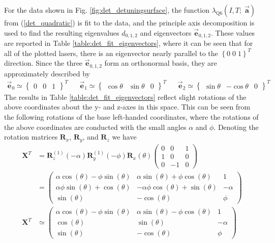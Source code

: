 \documentclass[12pt]{report}
\begin{document}
	For the data shown in Fig. \ref{fig:det_detuningsurface}, the function $\lambda_\mathrm{Q6}(I, T;\; \vec{\mathbf{a}})$ from (\ref{det_quadratic}) is fit to the data, and the principle axis decomposition is used to find the resulting eigenvalues $d_{0,1,2}$ and eigenvectors $\vec{\textbf{e}}_{0,1,2}$. These values are reported in Table \ref{table:det_fit_eigenvectors}, where it can be seen that for all of the plotted lasers, there is an eigenvector nearly parallel to the $\left\{0\;0\;1\right\}^T$ direction. Since the three $\vec{\textbf{e}}_{0,1,2}$ form an orthonormal basis, they are approximately described by
	\begin{align}
		\vec{\textbf{e}}_0 \simeq \begin{Bmatrix} 0 & 0 & 1 \end{Bmatrix}^T &&
		\vec{\textbf{e}}_1 \simeq \begin{Bmatrix} \cos\theta & \sin\theta & 0 \end{Bmatrix}^T &&
		\vec{\textbf{e}}_2 \simeq \begin{Bmatrix} \sin\theta & -\cos\theta & 0 \end{Bmatrix}^T &&
	\end{align}
	The results in Table \ref{table:det_fit_eigenvectors} reflect slight rotations of the above coordinates about the y- and z-axes in this space. This can be seen from the following rotations of the base left-handed coordinates, where the rotations of the above coordinates are conducted with the small angles $\alpha$ and $\phi$. Denoting the rotation matrices $\textbf{R}_x$, $\textbf{R}_y$, and $\textbf{R}_z$ we have
	\begin{align} \label{det_eigen_rotation}
		\textbf{X}^T &= \textbf{R}^{(1)}_z(-\alpha) \textbf{R}^{(1)}_y(-\phi) \textbf{R}_x(\theta)
		\begin{pmatrix}
			0 & 0 & 1 \\
			1 & 0 & 0 \\
			0 & -1 & 0
		\end{pmatrix} \nonumber\\
		&=\left(\begin{matrix}\alpha \cos{\left(\theta \right)} - \phi \sin{\left(\theta \right)} & \alpha \sin{\left(\theta \right)} + \phi \cos{\left(\theta \right)} & 1\\\alpha \phi \sin{\left(\theta \right)} + \cos{\left(\theta \right)} & - \alpha \phi \cos{\left(\theta \right)} + \sin{\left(\theta \right)} & - \alpha\\\sin{\left(\theta \right)} & - \cos{\left(\theta \right)} & \phi\end{matrix}\right) \nonumber\\
		\textbf{X}^T & \simeq
		\left(\begin{matrix}\alpha \cos{\left(\theta \right)} - \phi \sin{\left(\theta \right)} & \alpha \sin{\left(\theta \right)} - \phi \cos{\left(\theta \right)} & 1 \\
		\cos{\left(\theta \right)} &  \sin{\left(\theta \right)} & -\alpha\\
		\sin{\left(\theta \right)} & - \cos{\left(\theta \right)} & \phi\end{matrix}\right)
	\end{align}
\end{document}

